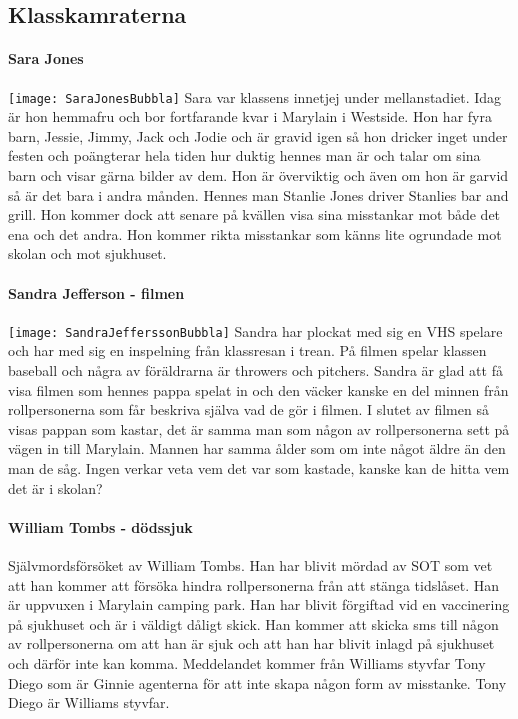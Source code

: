 \documentclass[a5paper,10pt]{report}
\begin{document}
\subsection{Klasskamraterna}
\paragraph{Sara Jones}
\texttt{[image: SaraJonesBubbla]}
Sara var klassens innetjej under mellanstadiet. Idag är hon hemmafru och bor fortfarande kvar i Marylain i Westside. Hon har fyra barn, Jessie, Jimmy, Jack och Jodie och är gravid igen så hon dricker inget under festen och poängterar hela tiden hur duktig hennes man är och talar om sina barn och visar gärna bilder av dem. Hon är överviktig och även om hon är garvid så är det bara i andra månden. Hennes man Stanlie Jones driver Stanlies bar and grill. Hon kommer dock att senare på kvällen visa sina misstankar mot både det ena och det andra. Hon kommer rikta misstankar som känns lite ogrundade mot skolan och mot sjukhuset.
\paragraph{Sandra Jefferson - filmen}
\texttt{[image: SandraJefferssonBubbla]}
Sandra har plockat med sig en VHS spelare och har med sig en inspelning från klassresan i trean. På filmen spelar klassen baseball och några av föräldrarna är throwers och pitchers. Sandra är glad att få visa filmen som hennes pappa spelat in och den väcker kanske en del minnen från rollpersonerna som får beskriva själva vad de gör i filmen. I slutet av filmen så visas pappan som kastar, det är samma man som någon av rollpersonerna sett på vägen in till Marylain. Mannen har samma ålder som om inte något äldre än den man de såg. Ingen verkar veta vem det var som kastade, kanske kan de hitta vem det är i skolan?
\paragraph{William Tombs - dödssjuk}
Självmordsförsöket av William Tombs. Han har blivit mördad av SOT som vet att han kommer att försöka hindra rollpersonerna från att stänga tidslåset. Han är uppvuxen i Marylain camping park. Han har blivit förgiftad vid en vaccinering på sjukhuset och är i väldigt dåligt skick. Han kommer att skicka sms till någon av rollpersonerna om att han är sjuk och att han har blivit inlagd på sjukhuset och därför inte kan komma. Meddelandet kommer från Williams styvfar Tony Diego som är Ginnie agenterna för att inte skapa någon form av misstanke. Tony Diego är Williams styvfar.
\end{document}
